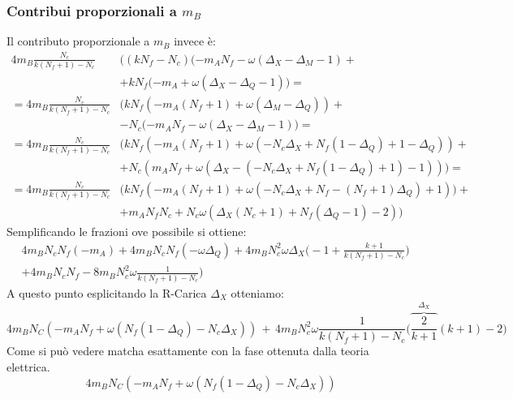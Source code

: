\documentclass[a4paper,12pt]{article}
\begin{document}
\subsubsection{Contribui  proporzionali a $m_B$}
Il contributo proporzionale a $m_B$ invece è:
\begin{align*}
 4 m_B \frac{N_c}{k(N_f+1)-N_c} & \bigg( (k N_f - N_c ) ( -m_A N_f - \omega ( \Delta_X - \Delta_M -1) +\\
 & +  k N_f ( -m_A + \omega ( \Delta_X - \Delta_Q -1) \bigg) = \\
 =   4 m_B \frac{N_c}{k(N_f+1)-N_c} & \bigg ( k N_f ( - m_A (N_f+1)  +\omega( \Delta_M - \Delta_Q)) +\\
 & - N_c ( - m_A N_f - \omega( \Delta_X - \Delta_M-1) \bigg) = \\
 = 4 m_B \frac{N_c}{k(N_f+1)-N_c} & \bigg ( k N_f ( - m_A (N_f+1) + \omega ( - N_c \Delta_X + N_f( 1- \Delta_Q) + 1  - \Delta_Q) ) + \\
 & + N_c (  m_A N_f +  \omega( \Delta_X - (- N_c \Delta_X + N_f( 1- \Delta_Q) + 1)-1) ) \bigg) = \\
  =  4 m_B \frac{N_c}{k(N_f+1)-N_c} & \bigg ( k N_f ( - m_A (N_f+1) +\omega( - N_c \Delta_X + N_f - (N_f+1) \Delta_Q) + 1)) +\\
  & + m_A N_f N_c   + N_c \omega  (    \Delta_X (N_c+1) + N_f( \Delta_Q - 1) - 2) \bigg)
\end{align*}
Semplificando le frazioni ove possibile si ottiene:
\begin{align*}
& 4 m_B N_c N_f (-m_A) + 4 m_B N_c N_f ( - \omega \Delta_Q)  + 4 m_B N_c^2 \omega \Delta_X \bigg(- 1 + \frac{k+1}{k (N_f+1)-N_c} \bigg) \\
& + 4 m_B N_c N_f   -8m_B N_c^2 \omega \frac{1}{k (N_f+1) - N_c}  \bigg)
\end{align*}
A questo punto esplicitando la R-Carica $\Delta_X$ otteniamo:
\begin{equation}
	4 m_B N_C ( - m_A N_f + \omega ( N_f ( 1 - \Delta_Q) - N_c \Delta_X )) \, + \, 4 m_B N_c^2 \omega \frac{1}{k (N_f+1)-N_c} \bigg( \overbrace{\frac{2}{k+1}}^{\Delta_X} (k+1) - 2 \bigg)
\end{equation}
Come si può vedere matcha esattamente con la fase ottenuta dalla teoria elettrica.
\begin{equation}
4 m_B N_C ( - m_A N_f + \omega ( N_f ( 1 - \Delta_Q) - N_c \Delta_X ))
\end{equation}
\end{document}
